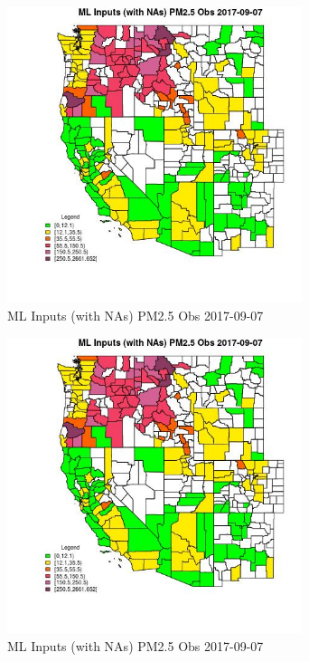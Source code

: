 
\clearpage 

\begin{figure} 
\centering  
\includegraphics[width=0.77\textwidth]{Code_Outputs/Report_ML_input_PM25_Step4_part_e_de_duplicated_aves_compiled_2019-05-20wNAs_CountyPM25_ObsMean2017-09-07.jpg} 
\caption{\label{fig:Report_ML_input_PM25_Step4_part_e_de_duplicated_aves_compiled_2019-05-20wNAsCountyPM25_ObsMean2017-09-07}ML Inputs (with NAs) PM2.5 Obs 2017-09-07} 
\end{figure} 
 

\begin{figure} 
\centering  
\includegraphics[width=0.77\textwidth]{Code_Outputs/Report_ML_input_PM25_Step4_part_e_de_duplicated_aves_compiled_2019-05-20wNAs_CountyPM25_ObsMean2017-09-07.jpg} 
\caption{\label{fig:Report_ML_input_PM25_Step4_part_e_de_duplicated_aves_compiled_2019-05-20wNAsCountyPM25_ObsMean2017-09-07}ML Inputs (with NAs) PM2.5 Obs 2017-09-07} 
\end{figure} 
 


